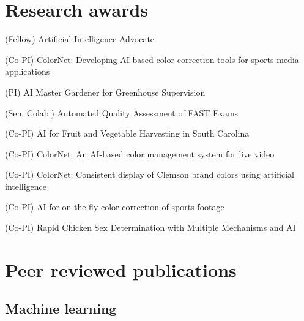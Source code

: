 \documentclass[11pt,letterpaper,roman]{moderncv}        %
\begin{document}

\section{Research awards}
\quad (Fellow) Artificial Intelligence Advocate

\quad (Co-PI) ColorNet: Developing AI-based color correction tools for sports media applications

\quad (PI) AI Master Gardener for Greenhouse Supervision

\quad (Sen. Colab.) Automated Quality Assessment of FAST Exams

\quad (Co-PI) AI for Fruit and Vegetable Harvesting in South Carolina

\quad (Co-PI) ColorNet: An AI-based color management system for live video

\quad (Co-PI) ColorNet: Consistent display of Clemson brand colors using artificial intelligence

\quad (Co-PI) AI for on the fly color correction of sports footage

\quad (Co-PI) Rapid Chicken Sex Determination with Multiple Mechanisms and AI


\section{Peer reviewed publications}
\subsection{Machine learning}

\begin{refsection}
  \nocite{*}
  \printbibliography[heading=none]
\end{refsection}
\end{document}
